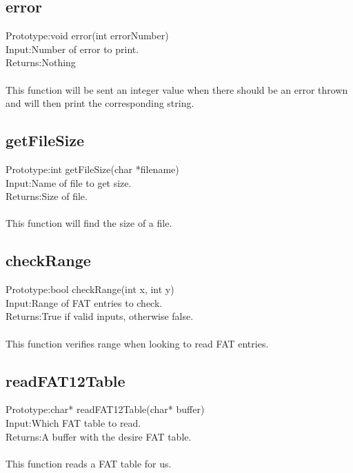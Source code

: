 \documentclass[a4paper]{article}
\begin{document}
\subsection{error}
Prototype:\hspace{0.2cm}void error(int errorNumber)\\
Input:\hspace{0.88cm}Number of error to print.\\
Returns:\hspace{0.51cm}Nothing\\\\
This function will be sent an integer value when there should be an error thrown and will then print the corresponding string.

\subsection{getFileSize}
Prototype:\hspace{0.2cm}int getFileSize(char *filename)\\
Input:\hspace{0.88cm}Name of file to get size.\\
Returns:\hspace{0.51cm}Size of file.\\\\
This function will find the size of a file.

\subsection{checkRange}
Prototype:\hspace{0.2cm}bool checkRange(int x, int y)\\
Input:\hspace{0.88cm}Range of FAT entries to check.\\
Returns:\hspace{0.51cm}True if valid inputs, otherwise false.\\\\
This function verifies range when looking to read FAT entries.

\subsection{readFAT12Table}
Prototype:\hspace{0.2cm}char* readFAT12Table(char* buffer)\\
Input:\hspace{0.88cm}Which FAT table to read.\\
Returns:\hspace{0.51cm}A buffer with the desire FAT table.\\\\
This function reads a FAT table for us.
\end{document}
